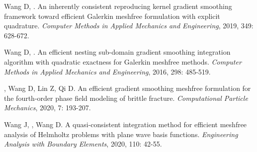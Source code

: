 \vspace{-50pt}
\begin{thebibliography}{1}

	Wang D, .
	\newblock An inherently consistent reproducing kernel gradient smoothing
	  framework toward efficient {{Galerkin}} meshfree formulation with explicit
	  quadrature.
	\newblock \emph{Computer Methods in Applied Mechanics and Engineering}, 2019,
	  349: 628-672.

	Wang D, .
	\newblock An efficient nesting sub-domain gradient smoothing integration
	  algorithm with quadratic exactness for {{Galerkin}} meshfree methods.
	\newblock \emph{Computer Methods in Applied Mechanics and Engineering}, 2016,
	  298: 485-519.

	, Wang D, Lin Z, Qi D.
	\newblock An efficient gradient smoothing meshfree formulation for the
	  fourth-order phase field modeling of brittle fracture.
	\newblock \emph{Computational Particle Mechanics}, 2020, 7: 193-207.

	Wang J, , Wang D.
	\newblock A quasi-consistent integration method for efficient meshfree analysis
	  of {{Helmholtz}} problems with plane wave basis functions.
	\newblock \emph{Engineering Analysis with Boundary Elements}, 2020, 110: 42-55.


\end{thebibliography}
